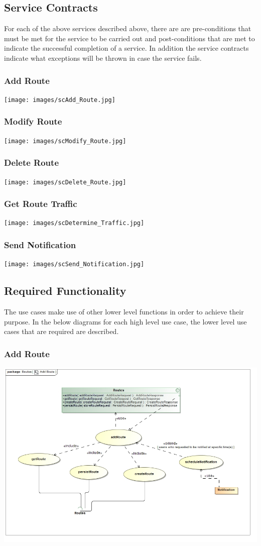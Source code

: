 \documentclass[a4paper,12pt]{article}
\begin{document}
\subsection{Service Contracts}
For each of the above services described above, there are are pre-conditions that must be met for the service to be carried out and post-conditions that are met to indicate the successful completion of a service. In addition the service contracts indicate what exceptions will be thrown in case the service fails.

\subsubsection{Add Route}
\texttt{[image: images/scAdd\_Route.jpg]}
\subsubsection{Modify Route} 
\texttt{[image: images/scModify\_Route.jpg]}
\subsubsection{Delete Route}
\texttt{[image: images/scDelete\_Route.jpg]}
\subsubsection{Get Route Traffic}
\texttt{[image: images/scDetermine\_Traffic.jpg]}
\subsubsection{Send Notification}
\texttt{[image: images/scSend\_Notification.jpg]}

\subsection{Required Functionality}
The use cases make use of other lower level functions in order to achieve their purpose. In the below diagrams for each high level use case, the lower level use cases that are required are described.
 
\subsubsection{Add Route}
\includegraphics[width=\textwidth]{images/Add_Route.jpg}
\end{document}
